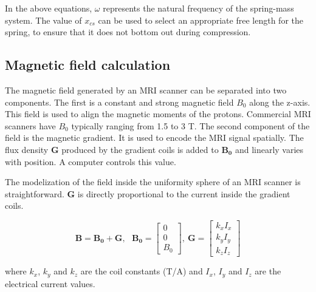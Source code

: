 \documentclass[letterpaper, 10 pt, conference]{ieeeconf}  %
\begin{document}
In the above equations, $\omega$ represents the natural frequency of the spring-mass system. The value of $x_{cs}$ can be used to select an appropriate free length for the spring, to ensure that it does not bottom out during compression. 
\subsection{Magnetic field calculation}
\label{magfield}
The magnetic field generated by an MRI scanner can be separated into two components. The first is a constant and strong magnetic field $B_0$ along the z-axis. This field is used to align the magnetic moments of the protons. Commercial MRI scanners have $B_0$ typically ranging from 1.5 to 3 T. The second component of the field is the magnetic gradient. It is used to encode the MRI signal spatially. The flux density $\mathbf{G}$ produced by the gradient coils is added to $\mathbf{B_0}$ and linearly varies with position. A computer controls this value.\par
The modelization of the field inside the uniformity sphere of an MRI scanner is straightforward. $\mathbf{G}$ is directly proportional to the current inside the gradient coils. 

\begin{equation}
\mathbf{B}=\mathbf{B_0}+\mathbf{G},~~~
\mathbf{B_0}=\begin{bmatrix}
0\\ 
0\\ 
B_0
\end{bmatrix},~
\mathbf{G}=\begin{bmatrix}
k_x I_x\\ 
k_y I_y\\ 
k_z I_z
\end{bmatrix}
\label{magfield}
\end{equation}

where $k_x$, $k_y$ and $k_z$ are the coil constants (T/A) and $I_x$, $I_y$ and $I_z$ are the electrical current values.\par
\end{document}
